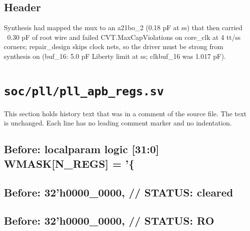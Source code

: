 \begin{record}

\subsection*{Header}

\begin{textblock}
Synthesis had mapped the mux to an a21bo_2 (0.18 pF at ss) that then carried ~0.30 pF of root wire and failed
CVT.MaxCapViolations on core_clk at 4 tt/ss corners; repair_design skips clock nets, so the driver must be
strong from synthesis on (buf_16: 5.0 pF Liberty limit at ss; clkbuf_16 was 1.017 pF).
\end{textblock}

\end{record}

\section{\texttt{soc/pll/pll\_apb\_regs.sv}}\label{cr:mod:pll-apb-regs}

This section holds history text that was in a comment of the source file. The text is unchanged. Each line has no leading comment marker and no indentation.

\begin{record}

\subsection*{Before: localparam logic [31:0] WMASK[N\_REGS] = '\{}


\subsection*{Before: 32'h0000\_0000,  // STATUS:  cleared}


\subsection*{Before: 32'h0000\_0000,  // STATUS:  RO}


\end{record}

